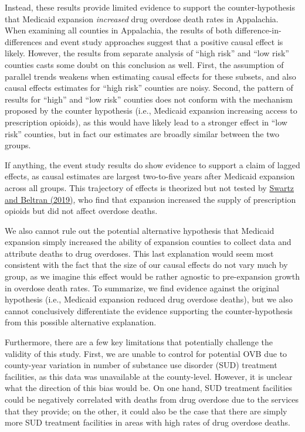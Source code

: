 \documentclass[
  11pt,
]{article}
\begin{document}
Instead, these results provide limited evidence to support the
counter-hypothesis that Medicaid expansion \emph{increased} drug
overdose death rates in Appalachia. When examining all counties in
Appalachia, the results of both difference-in-differences and event
study approaches suggest that a positive causal effect is likely.
However, the results from separate analysis of ``high risk'' and ``low
risk'' counties casts some doubt on this conclusion as well. First, the
assumption of parallel trends weakens when estimating causal effects for
these subsets, and also causal effects estimates for ``high risk''
counties are noisy. Second, the pattern of results for ``high'' and
``low risk'' counties does not conform with the mechanism proposed by
the counter hypothesis (i.e., Medicaid expansion increasing access to
prescription opioids), as this would have likely lead to a stronger
effect in ``low risk'' counties, but in fact our estimates are broadly
similar between the two groups.

If anything, the event study results do show evidence to support a claim
of lagged effects, as causal estimates are largest two-to-five years
after Medicaid expansion across all groups. This trajectory of effects
is theorized but not tested by
\href{https://onlinelibrary.wiley.com/doi/epdf/10.1111/add.14741}{Swartz
and Beltran (2019)}, who find that expansion increased the supply of
prescription opioids but did not affect overdose deaths.

We also cannot rule out the potential alternative hypothesis that
Medicaid expansion simply increased the ability of expansion counties to
collect data and attribute deaths to drug overdoses. This last
explanation would seem most consistent with the fact that the size of
our causal effects do not vary much by group, as we imagine this effect
would be rather agnostic to pre-expansion growth in overdose death
rates. To summarize, we find evidence against the original hypothesis
(i.e., Medicaid expansion reduced drug overdose deaths), but we also
cannot conclusively differentiate the evidence supporting the
counter-hypothesis from this possible alternative explanation.

Furthermore, there are a few key limitations that potentially challenge
the validity of this study. First, we are unable to control for
potential OVB due to county-year variation in number of substance use
disorder (SUD) treatment facilities, as this data was unavailable at the
county-level. However, it is unclear what the direction of this bias
would be. On one hand, SUD treatment facilities could be negatively
correlated with deaths from drug overdose due to the services that they
provide; on the other, it could also be the case that there are simply
more SUD treatment facilities in areas with high rates of drug overdose
deaths.
\end{document}
